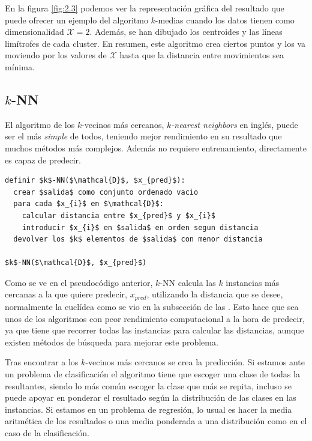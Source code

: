En la figura \ref{fig:2.3} podemos ver la representación gráfica del resultado que puede ofrecer un ejemplo del algoritmo $k$-medias cuando los datos tienen como dimensionalidad $\mathcal{X} = 2$. Además, se han dibujado los centroides y las líneas limítrofes de cada cluster. En resumen, este algoritmo crea ciertos puntos y los va moviendo por los valores de $\mathcal{X}$ hasta que la distancia entre movimientos sea mínima.

\subsection{$k$-NN} \label{subsec:2.5.2}

El algoritmo de los $k$-vecinos más cercanos, \emph{$k$-nearest neighbors} en inglés, puede ser el más \emph{simple} de todos, teniendo mejor rendimiento en su resultado que muchos métodos más complejos. Además no requiere entrenamiento, directamente es capaz de predecir.

\vspace*{3mm}
\lstset{style=pseudocode}
\begin{lstlisting}
definir $k$-NN($\mathcal{D}$, $x_{pred}$):
  crear $salida$ como conjunto ordenado vacio
  para cada $x_{i}$ en $\mathcal{D}$:
    calcular distancia entre $x_{pred}$ y $x_{i}$
    introducir $x_{i}$ en $salida$ en orden segun distancia
  devolver los $k$ elementos de $salida$ con menor distancia

$k$-NN($\mathcal{D}$, $x_{pred}$)
\end{lstlisting}

Como se ve en el pseudocódigo anterior, $k$-NN calcula las $k$ instancias más cercanas a la que quiere predecir, $x_{pred}$, utilizando la distancia que se desee, normalmente la euclídea como se vio en la subsección de las . Esto hace que sea unos de los algoritmos con peor rendimiento computacional a la hora de predecir, ya que tiene que recorrer todas las instancias para calcular las distancias, aunque existen métodos de búsqueda para mejorar este problema.

Tras encontrar a los $k$-vecinos más cercanos se crea la predicción. Si estamos ante un problema de clasificación el algoritmo tiene que escoger una clase de todas la resultantes, siendo lo más común escoger la clase que más se repita, incluso se puede apoyar en ponderar el resultado según la distribución de las clases en las instancias. Si estamos en un problema de regresión, lo usual es hacer la media aritmética de los resultados o una media ponderada a una distribución como en el caso de la clasificación.

